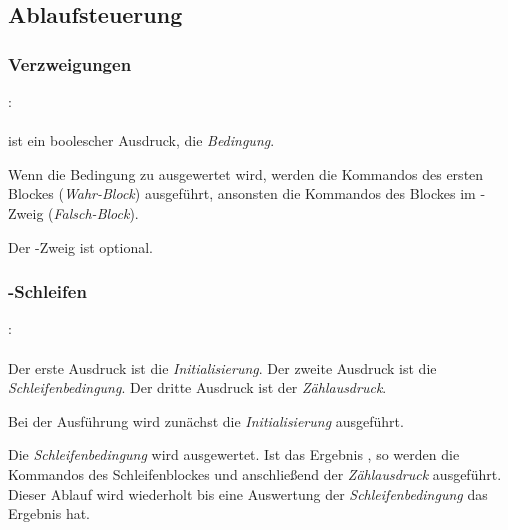 \subsection{Ablaufsteuerung}\label{Ablaufsteuerung}
\subsubsection{Verzweigungen}\label{Verzweigungen}
:\label{verzweigung}\\
\hspace*{1cm}\Gspace\Gt{(}\Gspace{} \Gspace\Gt{)}\Gspace\Gt{\{}\Gspace{} \Gspace\Gt{\}}\Gspace{}\\

\glq{}\grq{} ist ein boolescher Ausdruck, die \emph{Bedingung}.

Wenn die Bedingung zu  ausgewertet wird, werden die Kommandos des ersten Blockes (\emph{Wahr-Block}) ausgeführt,
ansonsten die Kommandos des Blockes im -Zweig (\emph{Falsch-Block}).

Der -Zweig ist optional.


\subsubsection{-Schleifen}\label{$_backslash$kw__for__-Schleifen}
:\label{schleife_for}\\
\hspace*{1cm}\Gspace\Gt{(}\Gspace{}\Gspace\Gt{;}\Gspace{}\Gspace\Gt{;}\Gspace{}\Gspace\Gt{)}\Gspace\Gt{\{}\Gspace{} \Gspace\Gt{\}}\\

Der erste Ausdruck ist die \emph{Initialisierung}. Der zweite Ausdruck ist die \emph{Schleifenbedingung}. Der dritte Ausdruck ist der \emph{Zählausdruck}.

Bei der Ausführung wird zunächst die \emph{Initialisierung} ausgeführt.

Die \emph{Schleifenbedingung} wird ausgewertet. Ist das Ergebnis , so werden die Kommandos des Schleifenblockes
und anschließend der \emph{Zählausdruck} ausgeführt.
Dieser Ablauf wird wiederholt bis eine Auswertung der \emph{Schleifenbedingung} das Ergebnis  hat.

